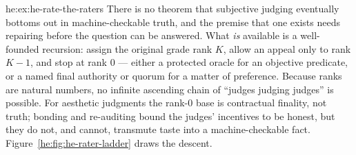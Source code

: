 \begin{pdSolution}{he:ex:he-rate-the-raters}
There is no theorem that subjective judging eventually bottoms out in
machine-checkable truth, and the premise that one exists needs repairing before
the question can be answered. What \emph{is} available is a well-founded
recursion: assign the original grade rank $K$, allow an appeal only to rank
$K{-}1$, and stop at rank $0$ --- either a protected oracle for an objective
predicate, or a named final authority or quorum for a matter of preference.
Because ranks are natural numbers, no infinite ascending chain of ``judges
judging judges'' is possible. For aesthetic judgments the rank-$0$ base is
contractual finality, not truth; bonding and re-auditing bound the judges'
incentives to be honest, but they do not, and cannot, transmute taste into a
machine-checkable fact. Figure~\ref{he:fig:he-rater-ladder} draws the descent.


\end{pdSolution}
